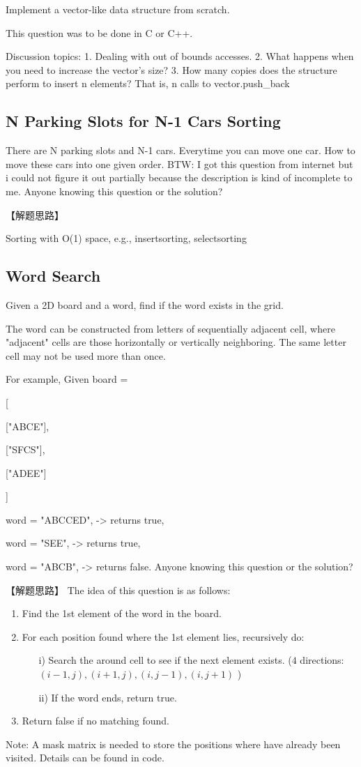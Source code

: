 Implement a vector-like data structure from scratch.

This question was to be done in C or C++.

Discussion topics:
1. Dealing with out of bounds accesses.
2. What happens when you need to increase the vector's size?
3. How many copies does the structure perform to insert n elements? That is, n
calls to vector.push_back

\subsection{N Parking Slots for N-1 Cars Sorting}
\label{sec:npark}

There are N parking slots and N-1 cars. Everytime you can move one car. How to move these cars into one given order.
BTW: I got this question from internet but i could not figure it out partially because the description is kind of incomplete to me. Anyone knowing this question or the solution?

【解题思路】

Sorting with O(1) space, e.g., insertsorting, selectsorting

\subsection{Word Search}
\label{sec:wordsearch}

Given a 2D board and a word, find if the word exists in the grid.

The word can be constructed from letters of sequentially adjacent cell, where "adjacent" cells are those horizontally or vertically neighboring. The same letter cell may not be
used more than once.

For example,
Given board =

[

	["ABCE"],

	["SFCS"],

	["ADEE"]

]

word = "ABCCED", -> returns true,

word = "SEE", -> returns true,

word = "ABCB", -> returns false. Anyone knowing this question or the solution?

【解题思路】
The idea of this question is as follows:
\begin{enumerate}
\item Find the 1st element of the word in the board.
\item For each position found where the 1st element lies, recursively do:
\begin{itemize}
\item[i)] Search the around cell to see if the next element exists. ($4$ directions: $(i-1,j),(i+1,j),(i,j-1),(i,j+1)$ )
\item[ii)] If the word ends, return true.
\end{itemize}
\item Return false if no matching found.
\end{enumerate}
Note: A mask matrix is needed to store the positions where have already been visited. Details can be found in code.

